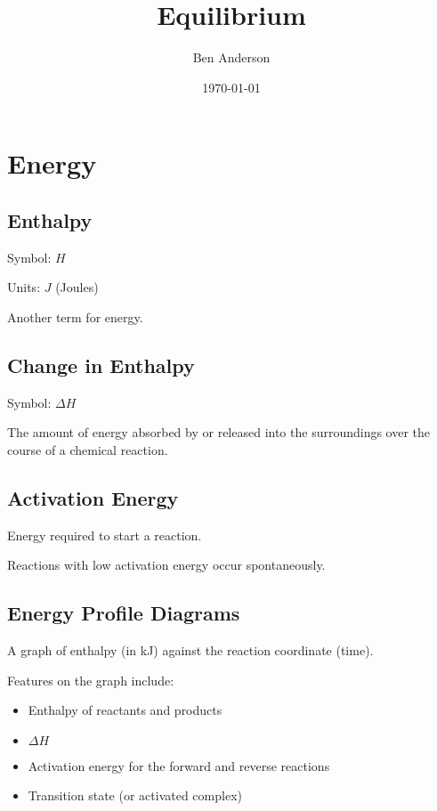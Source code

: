 \documentclass[a4paper,11pt]{article}
\begin{document}
\title{Equilibrium}
\author{Ben Anderson}
\date{\today}
\maketitle
\pagebreak

\tableofcontents
\pagebreak



\section{Energy}

\subsection{Enthalpy}

Symbol: $H$

Units: $J$ (Joules)

Another term for energy.


\subsection{Change in Enthalpy}

Symbol: $\Delta H$

The amount of energy absorbed by or released into the surroundings over the
course of a chemical reaction.


\subsection{Activation Energy}

Energy required to start a reaction.

Reactions with low activation energy occur spontaneously.


\subsection{Energy Profile Diagrams}

A graph of enthalpy (in kJ) against the reaction coordinate (time).

Features on the graph include:

\begin{itemize}
\item Enthalpy of reactants and products
\item $\Delta H$
\item Activation energy for the forward and reverse reactions
\item Transition state (or activated complex)
\end{itemize}
\end{document}
